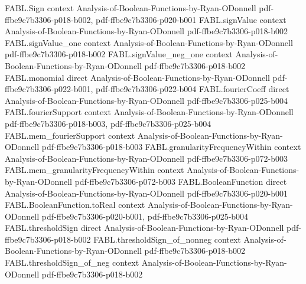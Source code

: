 \begin{theorem}
\label{FABL.sq_discreteDerivative_toReal_eq_pivotalIndicator}
\leanok
{}
\proofstep
  {FABL.Sign}
  {context}
  {Analysis-of-Boolean-Functions-by-Ryan-ODonnell}
  {pdf-ffbe9c7b3306-p018-b002,
    pdf-ffbe9c7b3306-p020-b001}
\proofstep
  {FABL.signValue}
  {context}
  {Analysis-of-Boolean-Functions-by-Ryan-ODonnell}
  {pdf-ffbe9c7b3306-p018-b002}
\proofstep
  {FABL.signValue_one}
  {context}
  {Analysis-of-Boolean-Functions-by-Ryan-ODonnell}
  {pdf-ffbe9c7b3306-p018-b002}
\proofstep
  {FABL.signValue_neg_one}
  {context}
  {Analysis-of-Boolean-Functions-by-Ryan-ODonnell}
  {pdf-ffbe9c7b3306-p018-b002}
\proofstep
  {FABL.monomial}
  {direct}
  {Analysis-of-Boolean-Functions-by-Ryan-ODonnell}
  {pdf-ffbe9c7b3306-p022-b001,
    pdf-ffbe9c7b3306-p022-b004}
\proofstep
  {FABL.fourierCoeff}
  {direct}
  {Analysis-of-Boolean-Functions-by-Ryan-ODonnell}
  {pdf-ffbe9c7b3306-p025-b004}
\proofstep
  {FABL.fourierSupport}
  {context}
  {Analysis-of-Boolean-Functions-by-Ryan-ODonnell}
  {pdf-ffbe9c7b3306-p018-b003,
    pdf-ffbe9c7b3306-p025-b004}
\proofstep
  {FABL.mem_fourierSupport}
  {context}
  {Analysis-of-Boolean-Functions-by-Ryan-ODonnell}
  {pdf-ffbe9c7b3306-p018-b003}
\proofstep
  {FABL.granularityFrequencyWithin}
  {context}
  {Analysis-of-Boolean-Functions-by-Ryan-ODonnell}
  {pdf-ffbe9c7b3306-p072-b003}
\proofstep
  {FABL.mem_granularityFrequencyWithin}
  {context}
  {Analysis-of-Boolean-Functions-by-Ryan-ODonnell}
  {pdf-ffbe9c7b3306-p072-b003}
\proofstep
  {FABL.BooleanFunction}
  {direct}
  {Analysis-of-Boolean-Functions-by-Ryan-ODonnell}
  {pdf-ffbe9c7b3306-p020-b001}
\proofstep
  {FABL.BooleanFunction.toReal}
  {context}
  {Analysis-of-Boolean-Functions-by-Ryan-ODonnell}
  {pdf-ffbe9c7b3306-p020-b001,
    pdf-ffbe9c7b3306-p025-b004}
\proofstep
  {FABL.thresholdSign}
  {direct}
  {Analysis-of-Boolean-Functions-by-Ryan-ODonnell}
  {pdf-ffbe9c7b3306-p018-b002}
\proofstep
  {FABL.thresholdSign_of_nonneg}
  {context}
  {Analysis-of-Boolean-Functions-by-Ryan-ODonnell}
  {pdf-ffbe9c7b3306-p018-b002}
\proofstep
  {FABL.thresholdSign_of_neg}
  {context}
  {Analysis-of-Boolean-Functions-by-Ryan-ODonnell}
  {pdf-ffbe9c7b3306-p018-b002}

\end{theorem}
